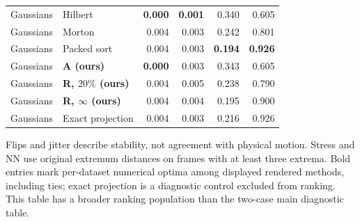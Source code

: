 \begin{longtable}{llrrrr}
Gaussians & Hilbert & \textbf{0.000} & \textbf{0.001} & 0.340 & 0.605\\
Gaussians & Morton & 0.004 & 0.003 & 0.242 & 0.801\\
Gaussians & Packed sort & 0.004 & 0.003 & \textbf{0.194} & \textbf{0.926}\\
Gaussians & \textbf{A (ours)} & \textbf{0.000} & 0.003 & 0.343 & 0.605\\
Gaussians & \textbf{R, $20\%$ (ours)} & 0.004 & 0.005 & 0.238 & 0.790\\
Gaussians & \textbf{R, $\infty$ (ours)} & 0.004 & 0.004 & 0.195 & 0.900\\
Gaussians & Exact projection & 0.004 & 0.003 & 0.216 & 0.926\\
\end{longtable}
\noindent Flips and jitter describe stability, not agreement with physical motion. Stress and NN use original extremum distances on frames with at least three extrema. Bold entries mark per-dataset numerical optima among displayed rendered methods, including ties; exact projection is a diagnostic control excluded from ranking. This table has a broader ranking population than the two-case main diagnostic table.\endgroup
